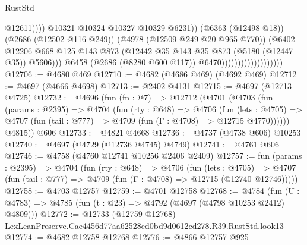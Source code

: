 \begin{lexlean}{RustStd}
\begin{coremodule}
                                                        @12611))))
                                                @10321
                                                @10324
                                                @10327
                                                @10329
                                                @6231))
                                            (@6363 (@12498 @18))
                                            (@2686 (@12502 @116 @249))
                                            (@4978 (@12509 @249 @20 @965 @770))
                                            (@6402
                                              @12206
                                              @668
                                              @125
                                              @143
                                              @873
                                              (@12442
                                                @35
                                                @143
                                                @35
                                                @873
                                                (@5180 (@12447 @35))
                                                @5606)))
                                          @6458
                                          (@2686 (@8280 @600 @117))
                                          @6470)))))))))))))))))))
@12706 := @4680 @469
@12710 := @4682 (@4686 @469) (@4692 @469)
@12712 := @4697 (@4666 @4698)
@12713 := @2402 @4131
@12715 := @4697 (@12713 @4725)
@12732 := @4696
    (fun (fn : @7) =>
    @12712
      (@4701
        (@4703
          (fun (params : @2395) =>
          @4704
            (fun (rty : @648) =>
            @4706
              (fun (lets : @4705) =>
              @4707 (fun (tail : @777) => @4709 (fun (Γ : @4708) => @12715 @4770))))))
        @4815))
    @606
@12733 := @4821 @4668
@12736 := @4737 (@4738 @606) @10253
@12740 := @4697 (@4729 (@12736 @4745) @4749)
@12741 := @4761 @606
@12746 := @4758 (@4760 @12741 @10256 @2406 @2409)
@12757 := fun (params : @2395) =>
  @4704
    (fun (rty : @648) =>
    @4706
      (fun (lets : @4705) =>
      @4707 (fun (tail : @777) => @4709 (fun (Γ : @4708) => @12715 (@12740 @12746)))))
@12758 := @4703 @12757
@12759 := @4701 @12758
@12768 := @4784
    (fun (U : @4783) => @4785 (fun (t : @23) => @4792 (@4697 (@4798 @10253 @2412) @4809)))
@12772 := @12733
    (@12759 @12768)
    LexLeanPreserve.Cae4456d77aa62528ed0bd9d0612cd278.R39.RustStd.look13
@12774 := @4682 @12758 @12768
@12776 := @4866 @12757 @925

\end{coremodule}
\end{lexlean}

